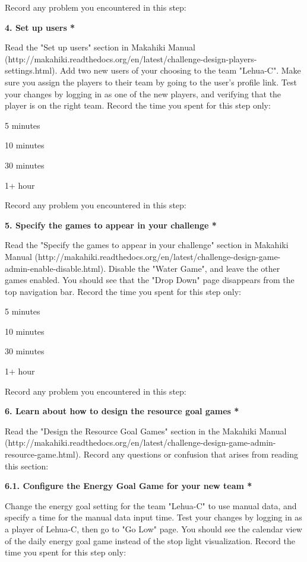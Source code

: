 Record any problem you encountered in this step:

{\bf 4. Set up users *}

Read the "Set up users" section in Makahiki Manual (http://makahiki.readthedocs.org/en/latest/challenge-design-players-settings.html). Add two new users of your choosing to the team "Lehua-C". Make sure you assign the players to their team by going to the user's profile link. Test your changes by logging in as one of the new players, and verifying that the player is on the right team. Record the time you spent for this step only:

\begin{compactitem}
\item 5 minutes
\item  10 minutes
\item  30 minutes
\item  1+ hour
\end{compactitem}


Record any problem you encountered in this step:

{\bf 5. Specify the games to appear in your challenge *}

Read the "Specify the games to appear in your challenge" section in Makahiki Manual (http://makahiki.readthedocs.org/en/latest/challenge-design-game-admin-enable-disable.html). Disable the "Water Game", and leave the other games enabled. You should see that the "Drop Down" page disappears from the top navigation bar. Record the time you spent for this step only:

\begin{compactitem}
\item 5 minutes
\item  10 minutes
\item  30 minutes
\item  1+ hour
\end{compactitem}


Record any problem you encountered in this step:

{\bf 6. Learn about how to design the resource goal games *}

Read the "Design the Resource Goal Games" section in the Makahiki Manual (http://makahiki.readthedocs.org/en/latest/challenge-design-game-admin-resource-game.html). Record any questions or confusion that arises from reading this section:

{\bf 6.1. Configure the Energy Goal Game for your new team *}

Change the energy goal setting for the team "Lehua-C" to use manual data, and specify a time for the manual data input time. Test your changes by logging in as a player of Lehua-C, then go to "Go Low" page. You should see the calendar view of the daily energy goal game instead of the stop light visualization. Record the time you spent for this step only:

